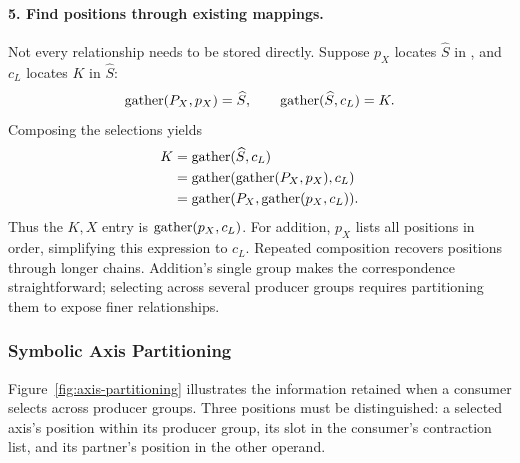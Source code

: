 \paragraph{5. Find positions through existing mappings.}
Not every relationship needs to be stored directly. Suppose $p_X$ locates
$\widehat S$ in , and $c_L$ locates $K$ in $\widehat S$:
\begin{equation}
 \operatorname{gather}(P_X,p_X)=\widehat S,\qquad \operatorname{gather}(\widehat S,c_L)=K.
\end{equation}
Composing the selections yields
\begin{equation}
\begin{aligned}
 K&=\operatorname{gather}(\widehat S,c_L)\\
  &=\operatorname{gather}(\operatorname{gather}(P_X,p_X),c_L)\\
  &=\operatorname{gather}(P_X,\operatorname{gather}(p_X,c_L)).
\end{aligned}
\label{eq:gather-composition}
\end{equation}
Thus the $K,X$ entry is $\operatorname{gather}(p_X,c_L)$. For addition, $p_X$ lists all
positions in order, simplifying this expression to $c_L$. Repeated composition
recovers positions through longer chains. Addition's single group makes the
correspondence straightforward; selecting across several producer groups
requires partitioning them to expose finer relationships.

\FloatBarrier
\subsubsection{Symbolic Axis Partitioning}
\label{sec:partitioning}
Figure~\ref{fig:axis-partitioning} illustrates the information retained when a
consumer selects across producer groups. Three positions must be distinguished:
a selected axis's position within its producer group, its slot in the
consumer's contraction list, and its partner's position in the other operand.


